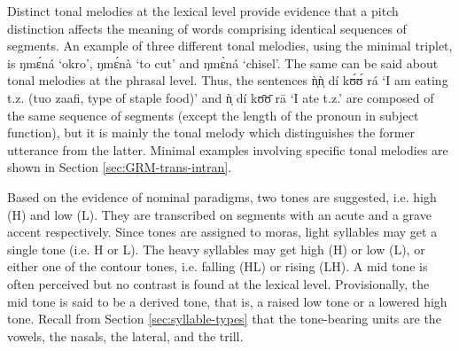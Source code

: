 Distinct tonal melodies at the lexical level provide evidence that a pitch 
distinction affects the meaning of words comprising identical sequences of 
segments.  An example of three different tonal 
melodies, using the minimal triplet, is   {\sls ŋmɛ́ná} `okro', {\sls ŋmɛ́nà} 
`to cut' and {\sls ŋmɛ̀ná}   `chisel'. The same can be said about tonal 
melodies at the phrasal level. Thus, 
the sentences {\sls ǹ̩ǹ̩ dí kʊ́ʊ́ rá} `I am eating t.z. ({\sls tuo zaafi}, 
type of staple food)' and {\sls ǹ̩ dí kʊ̄ʊ̄ rā} `I ate t.z.' are composed of 
the same sequence of segments (except the length of the pronoun in subject 
function), but it is mainly  the tonal melody which distinguishes the former 
utterance from the latter.   Minimal examples involving specific tonal melodies 
are shown  in Section \ref{sec:GRM-trans-intran}.

Based on the evidence of nominal paradigms,  two tones are suggested, i.e. high 
(H) and
low (L).
They are transcribed on segments with an acute and a grave  accent respectively.
Since tones are assigned to moras, light syllables may get a single tone (i.e. H
or L). The heavy syllables may get high (H) or low (L), or either one of the
contour tones, i.e. falling (HL) or rising (LH). A mid tone is often perceived
but no contrast is found  at the lexical level. Provisionally,  the
{mid tone} is said to be a derived tone, that is, a raised low tone  or a 
lowered
high tone. Recall from Section \ref{sec:syllable-types} that the tone-bearing 
units are the vowels, the nasals, the lateral,  and the trill.  


